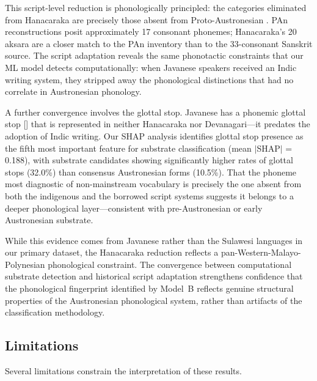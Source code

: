 \documentclass[12pt]{article}
\begin{document}
This script-level reduction is phonologically principled: the categories eliminated from Hanacaraka are precisely those absent from Proto-Austronesian \citep{blust2009}.
PAn reconstructions posit approximately 17 consonant phonemes; Hanacaraka's 20 aksara are a closer match to the PAn inventory than to the 33-consonant Sanskrit source.
The script adaptation reveals the same phonotactic constraints that our ML model detects computationally: when Javanese speakers received an Indic writing system, they stripped away the phonological distinctions that had no correlate in Austronesian phonology.

A further convergence involves the glottal stop.
Javanese has a phonemic glottal stop [] that is represented in neither Hanacaraka nor Devanagari---it predates the adoption of Indic writing.
Our SHAP analysis identifies glottal stop presence as the fifth most important feature for substrate classification (mean $|$SHAP$|$ = 0.188), with substrate candidates showing significantly higher rates of glottal stops (32.0\%) than consensus Austronesian forms (10.5\%).
That the phoneme most diagnostic of non-mainstream vocabulary is precisely the one absent from both the indigenous and the borrowed script systems suggests it belongs to a deeper phonological layer---consistent with pre-Austronesian or early Austronesian substrate.

While this evidence comes from Javanese rather than the Sulawesi languages in our primary dataset, the Hanacaraka reduction reflects a pan-Western-Malayo-Polynesian phonological constraint.
The convergence between computational substrate detection and historical script adaptation strengthens confidence that the phonological fingerprint identified by Model~B reflects genuine structural properties of the Austronesian phonological system, rather than artifacts of the classification methodology.

\subsection{Limitations}
\label{sec:limitations}

Several limitations constrain the interpretation of these results.
\end{document}
